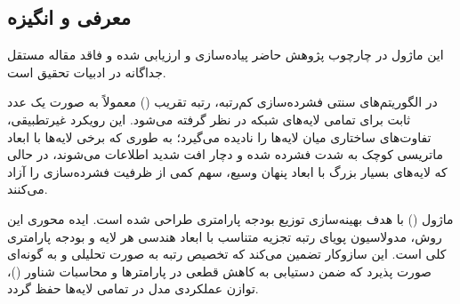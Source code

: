 \subsection{معرفی و انگیزه}
این ماژول در چارچوب پژوهش حاضر پیاده‌سازی و ارزیابی شده و فاقد مقاله مستقل جداگانه در ادبیات تحقیق است.

در الگوریتم‌های سنتی فشرده‌سازی کم‌رتبه، رتبه تقریب () معمولاً به صورت یک عدد ثابت برای تمامی لایه‌های شبکه در نظر گرفته می‌شود. این رویکرد غیرتطبیقی، تفاوت‌های ساختاری میان لایه‌ها را نادیده می‌گیرد؛ به طوری که برخی لایه‌ها با ابعاد ماتریسی کوچک به شدت فشرده شده و دچار افت شدید اطلاعات می‌شوند، در حالی که لایه‌های بسیار بزرگ با ابعاد پنهان وسیع، سهم کمی از ظرفیت فشرده‌سازی را آزاد می‌کنند.

ماژول  () با هدف بهینه‌سازی توزیع بودجه پارامتری طراحی شده است. ایده محوری این روش، مدولاسیون پویای رتبه تجزیه متناسب با ابعاد هندسی هر لایه و بودجه پارامتری کلی است. این سازوکار تضمین می‌کند که تخصیص رتبه به صورت تحلیلی و به گونه‌ای صورت پذیرد که ضمن دستیابی به کاهش قطعی در پارامترها و محاسبات شناور ()، توازن عملکردی مدل در تمامی لایه‌ها حفظ گردد.
